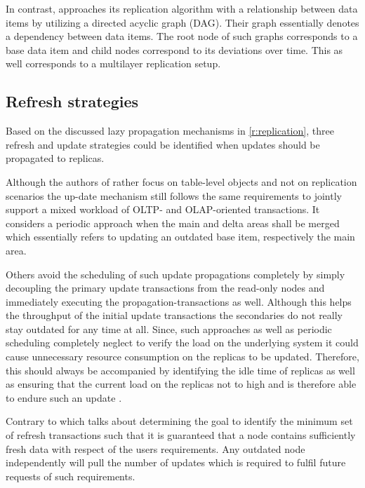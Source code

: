 In contrast, \cite{xiang:2008} approaches its replication algorithm with a relationship between data items by utilizing a directed acyclic graph (DAG).
Their graph essentially denotes a dependency between data items. The root node of such graphs corresponds to a base data item and child nodes correspond 
to its deviations over time. This as well corresponds to a multilayer replication setup.






\subsection{Refresh strategies}
\label{r:strategies}
Based on the discussed lazy propagation mechanisms in \ref{r:replication}, three refresh and update strategies could be identified when updates should be propagated 
to replicas.

Although the authors of \cite{psaroudakis:2015} rather focus on table-level objects and not on replication scenarios the up-date mechanism 
still follows the same requirements to jointly support a mixed workload of OLTP- and OLAP-oriented transactions.
It considers a periodic approach when the main and delta areas shall be merged which essentially refers to updating an outdated base item, respectively the main area.

Others \cite{rohm:2002} avoid the scheduling of such update propagations completely by simply decoupling the primary update transactions from the read-only nodes
and immediately executing the propagation-transactions as well. Although this helps the throughput of the initial update transactions the secondaries do not really 
stay outdated for any time at all. Since, such approaches as well as periodic scheduling completely neglect to verify the load on the underlying system it could 
cause unnecessary resource consumption on the replicas to be updated. Therefore, this should always be accompanied by identifying the idle time of replicas as well 
as ensuring that the current load on the replicas not to high and is therefore able to endure such an update \cite{voicu:2010}.

Contrary to \cite{peralta:2006} which talks about determining the goal to identify the minimum set of refresh transactions such that it is guaranteed that a node contains 
sufficiently fresh data with respect of the users requirements. Any outdated node independently will pull the number of updates which is required to fulfil future requests 
of such requirements.

